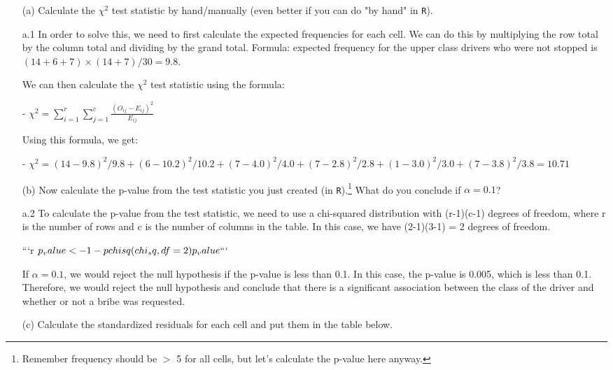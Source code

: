 \documentclass[12pt,letterpaper]{article}
\begin{document}
\begin{enumerate}
	
	\item [(a)]
	Calculate the $\chi^2$ test statistic by hand/manually (even better if you can do "by hand" in \texttt{R}).\\
	\vspace{.5cm}
	
	a.1 In order to solve this, we need to first calculate the expected frequencies for each cell. We can do this by multiplying the row total by the column total and dividing by the grand total. 
Formula: expected frequency for the upper class drivers who were not stopped is $(14+6+7)\times(14+7)/30 = 9.8$. 

We can then calculate the $\chi^2$ test statistic using the formula:

- $\chi^2 = \sum\limits_{i=1}^{r}\sum\limits_{j=1}^{c} \frac{(O_{ij}-E_{ij})^2}{E_{ij}}$

Using this formula, we get:

- $\chi^2 = (14-9.8)^2/9.8 + (6-10.2)^2/10.2 + (7-4.0)^2/4.0 + (7-2.8)^2/2.8 + (1-3.0)^2/3.0 + (7-3.8)^2/3.8 = 10.71$
	\vspace{.5cm}
	
		\item [(b)]
	Now calculate the p-value from the test statistic you just created (in \texttt{R}).\footnote{Remember frequency should be $>$ 5 for all cells, but let's calculate the p-value here anyway.}  What do you conclude if $\alpha = 0.1$?\\
	\vspace{0.5cm}

a.2 To calculate the p-value from the test statistic, we need to use a chi-squared distribution with (r-1)(c-1) degrees of freedom, where r is the number of rows and c is the number of columns in the table. In this case, we have (2-1)(3-1) = 2 degrees of freedom. 

```{r}
$p_value <- 1 - pchisq(chi_sq, df = 2)
p_value
```
$\endgroup

If $\alpha = 0.1$, we would reject the null hypothesis if the p-value is less than 0.1. In this case, the p-value is 0.005, which is less than 0.1. Therefore, we would reject the null hypothesis and conclude that there is a significant association between the class of the driver and whether or not a bribe was requested.
	
	\newpage
(c) Calculate the standardized residuals for each cell and put them in the table below.
\vspace{1cm}


\end{enumerate}
\end{document}

